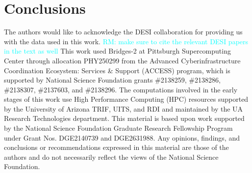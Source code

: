\documentclass[reprint,superscriptaddress,showframe,nofootinbib,aps,prd,longbibliography,noeprint]{revtex4-2}
\newcommand{\rachel}[1]{{\textcolor{cyan}{RM: #1}}}
\begin{document}








\section{Conclusions}
\label{sec:conclusion}
\lipsum[1][1]

\begin{acknowledgments}
The authors would like to acknowledge the DESI collaboration for providing us with the data used in this work. \rachel{make sure to cite the relevant DESI papers in the text as well} This work used Bridges-2 \citep{Bridges2} at Pittsburgh Supercomputing Center through allocation PHY250299 from the Advanced Cyberinfrastructure Coordination Ecosystem: Services \& Support (ACCESS) program, which is supported by National Science Foundation grants \#2138259, \#2138286, \#2138307, \#2137603, and \#2138296. The computations involved in the early stages of this work use High Performance Computing (HPC) resources supported by the University of Arizona TRIF, UITS, and RDI and maintained by the UA Research Technologies department. This material is based upon work supported by the National Science Foundation Graduate Research Fellowship Program under Grant Nos. DGE2140739 and DGE2631988. Any opinions, findings, and conclusions or recommendations expressed in this material are those of the authors and do not necessarily reflect the views of the National Science Foundation.
\end{acknowledgments} 

%
\end{document}
